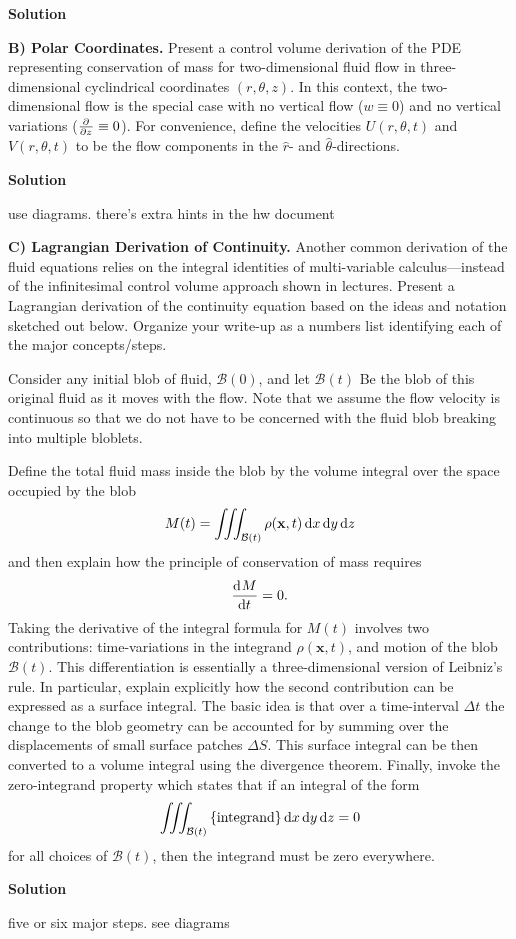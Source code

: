 \documentclass{article}
\def\*#1{\mathbf{#1}}
\newcommand{\B}{\mathcal{B}}
\begin{document}
\textbf{Solution}

\newpage

\textbf{B) Polar Coordinates.} Present a control volume derivation of
the PDE representing conservation of mass for two-dimensional fluid flow
in three-dimensional cyclindrical coordinates $(r, \theta, z)$. In this
context, the two-dimensional flow is the special case with no vertical
flow ($w \equiv 0$) and no vertical variations ($\pd{}{z} \equiv 0$).
For convenience, define the velocities $U(r, \theta, t)$ and $V(r,
\theta, t)$ to be the flow components in the $\hat{r}$- and
$\hat{\theta}$-directions.

\textbf{Solution}

use diagrams. there's extra hints in the hw document

\newpage

\textbf{C) Lagrangian Derivation of Continuity.} Another common
derivation of the fluid equations relies on the integral identities of
multi-variable calculus---instead of the infinitesimal control volume
approach shown in lectures. Present a Lagrangian derivation of the
continuity equation based on the ideas and notation sketched out below.
Organize your write-up as a numbers list identifying each of the major
concepts/steps.

Consider any initial blob of fluid, $\B(0)$, and let $\B(t)$ Be the blob
of this original fluid as it moves with the flow. Note that we assume
the flow velocity is continuous so that we do not have to be concerned
with the fluid blob breaking into multiple bloblets.

Define the total fluid mass inside the blob by the volume integral over
the space occupied by the blob
%
\begin{equation*}
    M(t) = \iiint_{\B(t)} \rho(\*x, t) \dif x \dif y \dif z
\end{equation*}
%
and then explain how the principle of conservation of mass requires
%
\begin{equation*}
    \dod{M}{t} = 0
    .
\end{equation*}
%
Taking the derivative of the integral formula for $M(t)$ involves two
contributions: time-variations in the integrand $\rho(\*x, t)$, and
motion of the blob $\B(t)$. This differentiation is essentially a
three-dimensional version of Leibniz's rule. In particular, explain
explicitly how the second contribution can be expressed as a surface
integral. The basic idea is that over a time-interval $\Delta t$ the
change to the blob geometry can be accounted for by summing over the
displacements of small surface patches $\Delta S$. This surface integral
can be then converted to a volume integral using the divergence theorem.
Finally, invoke the zero-integrand property which states that if an
integral of the form
%
\begin{equation*}
    \iiint_{\B(t)} \cbr{\text{integrand}} \dif x \dif y \dif z = 0
\end{equation*}
%
for all choices of $\B(t)$, then the integrand must be zero everywhere.


\textbf{Solution}

five or six major steps. see diagrams
\end{document}
